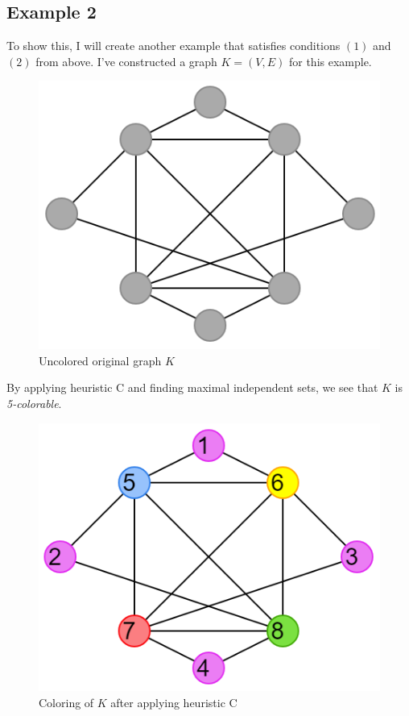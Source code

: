 \documentclass{article}
\begin{document}
\subsection*{Example 2}
To show this, I will create another example that satisfies conditions \((1)\) and \((2)\) from above. I've constructed a graph \(K = (V,E)\) for this example.

\begin{figure}[H]
\centering
\includegraphics[scale=0.38]{images/mis-1.png}
\caption{Uncolored original graph \(K\)}
\end{figure}

By applying heuristic C and finding maximal independent sets, we see that \(K\) is \emph{5-colorable}.

\begin{figure}[H]
\centering
\includegraphics[scale=0.38]{images/mis-2.png}
\caption{Coloring of \(K\) after applying heuristic C}
\end{figure}
\end{document}

